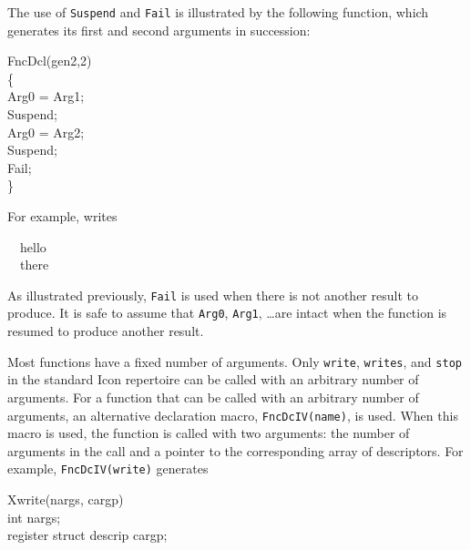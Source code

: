 The use of \texttt{Suspend} and \texttt{Fail} is illustrated by the following function,
which generates its first and second arguments in succession:
\goodbreak
\begin{iconcode}
\color{red}FncDcl(gen2,2)\\
\{\\
\>Arg0 = Arg1;\\
\>Suspend;\\
\>Arg0 = Arg2;\\
\>Suspend;\\
\>Fail;\\
\}
\end{iconcode}
\noindent
For example,
\noindent
writes
\goodbreak
\begin{iconcode}
\ \ hello\\
\ \ there
\end{iconcode}

\noindent
As illustrated previously, \texttt{Fail} is used when there is not another
result to produce. It is safe to assume that \texttt{Arg0}, \texttt{Arg1},
\ldots are intact when the function is resumed to produce another result.

Most functions have a fixed number of arguments. Only \texttt{write}, \texttt{writes},
and \texttt{stop} in the standard Icon repertoire can be called with an
arbitrary number of arguments. For a function that can be called with
an arbitrary number of arguments, an alternative declaration macro,
\texttt{FncDcIV(name)}, is used. When this macro is used, the function is
called with two arguments: the number of arguments in the call and a
pointer to the corresponding array of descriptors. For example,
\texttt{FncDcIV(write)} generates

\goodbreak
\begin{iconcode}
Xwrite(nargs, cargp)\\
int nargs;\\
register struct descrip cargp;
\end{iconcode}

